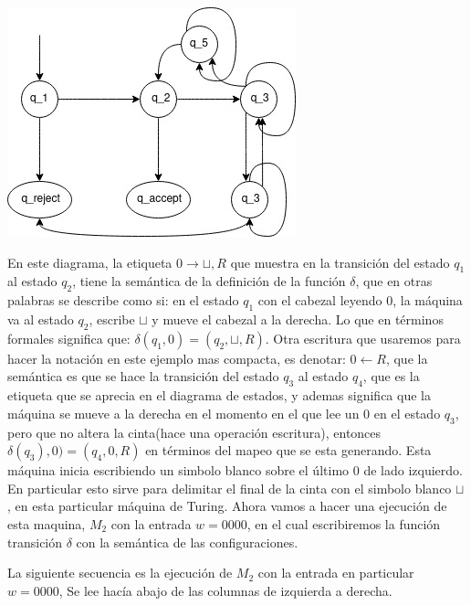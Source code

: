 \documentclass[10pt]{report}
\begin{document}
    \begin{center}
        \includegraphics{Untitled Diagram.jpg}
    \end{center}
    \newline
    En este diagrama, la etiqueta $0\rightarrow \sqcup,R$ que muestra en la transición del estado $q_{1}$ al estado $q_{2}$,
    tiene la semántica de la definición de la función $\delta$, que en otras palabras se describe como si:\newline
    en el estado $q_{1}$ con el cabezal leyendo $0$, la máquina va al estado $q_{2}$, escribe $\sqcup$ y mueve el cabezal
    a la derecha.\newline
    Lo que en términos formales significa que: $\delta(q_{1},0) = (q_{2},\sqcup, R)$.
    Otra escritura que usaremos para hacer la notación en este ejemplo mas compacta,
    es denotar: $0\leftarrow R$, que la semántica es que se hace la transición del estado $q_{3}$ al estado $q_{4}$, que
    es la etiqueta que se aprecia en el diagrama de estados, y ademas significa que la máquina se mueve a la derecha en
    el momento en el que lee un $0$ en el estado $q_{3}$, pero que no altera la cinta(\no hace una operación escritura),
    entonces $\delta(q_{3}),0) = (q_{4},0,R)$ en términos del mapeo que se esta generando.\newline
    Esta máquina inicia escribiendo un simbolo blanco sobre el último $0$ de lado izquierdo. En particular esto sirve
    para delimitar el final de la cinta con el simbolo blanco $\sqcup$, en esta particular máquina de Turing.
    \newline
    Ahora vamos a hacer una ejecución de esta maquina, $M_{2}$ con la entrada $w = 0000$, en el cual escribiremos la función
    transición $\delta$ con la semántica de las configuraciones.

    La siguiente secuencia es la ejecución de $M_{2}$ con la entrada en particular $w = 0000$,
    Se lee hacía abajo de las columnas de izquierda a derecha.
\end{document}
